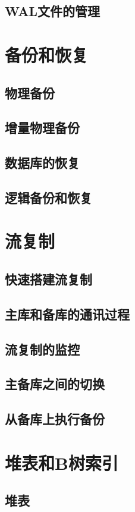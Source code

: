 \documentclass[lang=cn,newtx,10pt,scheme=chinese]{elegantbook}
\begin{document}
\section{WAL文件的管理}

\chapter{备份和恢复}
\section{物理备份}
\section{增量物理备份}
\section{数据库的恢复}
\section{逻辑备份和恢复}

\chapter{流复制}
\section{快速搭建流复制}
\section{主库和备库的通讯过程}
\section{流复制的监控}
\section{主备库之间的切换}
\section{从备库上执行备份}

\chapter{堆表和B树索引}
\section{堆表}
\end{document}

